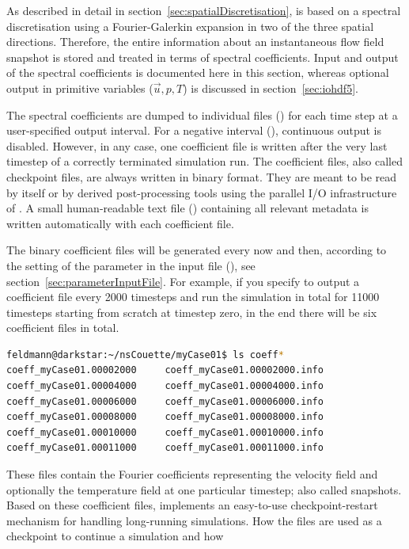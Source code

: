 \documentclass[a4paper, 11pt, DIV=11]{scrartcl}
\begin{document}
As described in detail in section~\ref{sec:spatialDiscretisation}, \nsc is based
on a spectral discretisation using a Fourier-Galerkin expansion in two of the
three spatial directions. Therefore, the entire information about an instantaneous
flow field snapshot is stored and treated in terms of spectral coefficients.
Input and output of the spectral coefficients is documented here in this section,
whereas optional output in primitive variables ($\vec{u}, p, T$) is discussed in
section~\ref{sec:iohdf5}.
\par
The spectral coefficients are dumped to individual files () for each time
step at a user-specified output interval. For a negative interval (),
continuous output is disabled. However, in any case, one coefficient file is written
after the very last timestep of a correctly terminated simulation run. The coefficient
files, also called checkpoint files, are always written in binary  format.
They are meant to be read by \nsc itself or by derived post-processing tools using the
parallel I/O infrastructure of \nsc. A small human-readable text file ()
containing all relevant metadata is written automatically with each coefficient file.
\par
The binary coefficient files will be generated every now and then, according to the
setting of the  parameter in the input file (),
see section~\ref{sec:parameterInputFile}. For example, if you specify to output a
coefficient file every \num{2000} timesteps and run the simulation in total for
\num{11000} timesteps starting from scratch at timestep zero, in the end there
will be six coefficient files in total.
\begin{lstlisting}[language=bash]
feldmann@darkstar:~/nsCouette/myCase01$ ls coeff*
coeff_myCase01.00002000     coeff_myCase01.00002000.info
coeff_myCase01.00004000     coeff_myCase01.00004000.info
coeff_myCase01.00006000     coeff_myCase01.00006000.info
coeff_myCase01.00008000     coeff_myCase01.00008000.info
coeff_myCase01.00010000     coeff_myCase01.00010000.info
coeff_myCase01.00011000     coeff_myCase01.00011000.info
\end{lstlisting}
These files contain the Fourier coefficients representing the velocity field
and optionally the temperature field at one particular timestep; also called
snapshots. Based on these coefficient files, \nsc implements an easy-to-use
checkpoint-restart mechanism for handling long-running simulations. How the
 files are used as a checkpoint to continue a simulation and how
\end{document}
